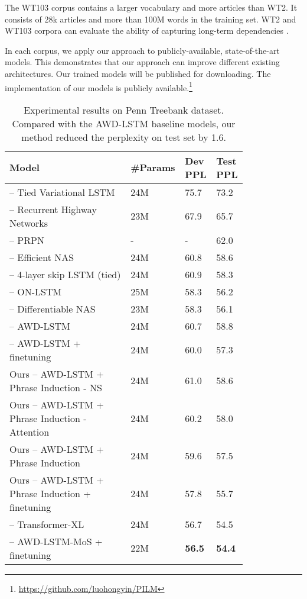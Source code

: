 \documentclass[11pt,a4paper]{article}
\begin{document}
The WT103 corpus contains a larger vocabulary and more articles than WT2. It consists of 28k articles and more than 100M words in the training set. WT2 and WT103 corpora can evaluate the ability of capturing long-term dependencies \cite{dai2018transformer}.



In each corpus, we apply our approach to publicly-available, state-of-the-art models. This demonstrates that our approach can improve different existing architectures. Our trained models will be published for downloading. The implementation of our models is publicly available.\footnote{\url{https://github.com/luohongyin/PILM}}

\begin{table*}[ht]
\centering
\begin{tabular}{p{0.5\linewidth}p{0.1\linewidth}p{0.1\linewidth}p{0.1\linewidth}}
\toprule
\textbf{Model} & \textbf{\#Params} & \textbf{Dev PPL} & \textbf{Test PPL}\\
\midrule
\citet{inan2016tying} -- Tied Variational LSTM & 24M & 75.7 & 73.2\\
\citet{zilly2017recurrent} -- Recurrent Highway Networks & 23M & 67.9 & 65.7\\
\citet{shen2017neural} -- PRPN & - & - & 62.0\\
\citet{pham2018efficient} -- Efficient NAS & 24M & 60.8 & 58.6\\
\citet{melis2017state} -- 4-layer skip LSTM (tied) & 24M & 60.9 & 58.3\\
\citet{shen2018ordered} -- ON-LSTM & 25M & 58.3 & 56.2\\
\citet{liu2018darts} -- Differentiable NAS & 23M & 58.3 & 56.1\\
\midrule
\citet{merity2017regularizing} -- AWD-LSTM & 24M & 60.7 & 58.8\\
\citet{merity2017regularizing} -- AWD-LSTM + finetuning & 24M & 60.0 & 57.3\\
\midrule
Ours -- AWD-LSTM + Phrase Induction - NS & 24M & 61.0 & 58.6 \\
Ours -- AWD-LSTM + Phrase Induction - Attention & 24M & 60.2 & 58.0 \\
Ours -- AWD-LSTM + Phrase Induction & 24M & 59.6 & 57.5\\
Ours -- AWD-LSTM + Phrase Induction + finetuning & 24M & 57.8 & 55.7 \\
\midrule
\citet{dai2018transformer} -- Transformer-XL & 24M & 56.7 & 54.5\\
\citet{yang2017breaking} -- AWD-LSTM-MoS + finetuning & 22M & \textbf{56.5} & \textbf{54.4}\\
\bottomrule
\end{tabular}
\caption{Experimental results on Penn Treebank dataset. Compared with the AWD-LSTM baseline models, our method reduced the perplexity on test set by 1.6.}
\label{tab:ptb}
\end{table*}
\end{document}
